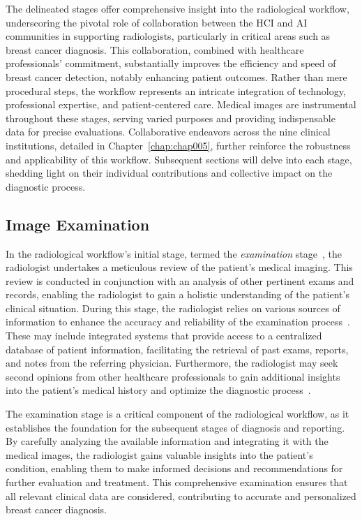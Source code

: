 \textcolor{revised}{The delineated stages offer comprehensive insight into the radiological workflow, underscoring the pivotal role of collaboration between the \ac{HCI} and \ac{AI} communities in supporting radiologists, particularly in critical areas such as breast cancer diagnosis.
This collaboration, combined with healthcare professionals' commitment, substantially improves the efficiency and speed of breast cancer detection, notably enhancing patient outcomes.
Rather than mere procedural steps, the workflow represents an intricate integration of technology, professional expertise, and patient-centered care.
Medical images are instrumental throughout these stages, serving varied purposes and providing indispensable data for precise evaluations.
Collaborative endeavors across the nine clinical institutions, detailed in Chapter~\ref{chap:chap005}, further reinforce the robustness and applicability of this workflow.
Subsequent sections will delve into each stage, shedding light on their individual contributions and collective impact on the diagnostic process.}

\subsection{Image Examination}
\label{sec:app001005001}

\textcolor{revised}{In the radiological workflow's initial stage, termed the {\it examination} stage~\cite{8621479}, the radiologist undertakes a meticulous review of the patient's medical imaging.
This review is conducted in conjunction with an analysis of other pertinent exams and records, enabling the radiologist to gain a holistic understanding of the patient's clinical situation.}
During this stage, the radiologist relies on various sources of information to enhance the accuracy and reliability of the examination process~\cite{islam2018recent, DIROBERTO2016950}.
These may include integrated systems that provide access to a centralized database of patient information, facilitating the retrieval of past exams, reports, and notes from the referring physician.
Furthermore, the radiologist may seek second opinions from other healthcare professionals to gain additional insights into the patient's medical history and optimize the diagnostic process~\cite{GIBSON2018113}.

The examination stage is a critical component of the radiological workflow, as it establishes the foundation for the subsequent stages of diagnosis and reporting.
By carefully analyzing the available information and integrating it with the medical images, the radiologist gains valuable insights into the patient's condition, enabling them to make informed decisions and recommendations for further evaluation and treatment.
This comprehensive examination ensures that all relevant clinical data are considered, contributing to accurate and personalized breast cancer diagnosis.

